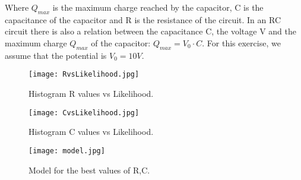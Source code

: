 \documentclass{article}
\begin{document}
Where $Q_{max}$ is the maximum charge reached by the capacitor, C is the capacitance of the capacitor and R is the resistance of the circuit. In an RC circuit there is also a relation between the capacitance C, the voltage V and the maximum charge $Q_{max}$ of the capacitor: $Q_{max} = V_0 \cdot C$. For this exercise, we assume that the potential is $V_0 = 10V$.

\begin{figure}[h!]
   \centering
    \texttt{[image: RvsLikelihood.jpg]}
    \caption{Histogram R values vs Likelihood.}
    \label{histogram2}
\end{figure}

\begin{figure}[h!]
   \centering
    \texttt{[image: CvsLikelihood.jpg]}
    \caption{Histogram C values vs Likelihood.}
    \label{histogram3}
\end{figure}

\begin{figure}[h!]
   \centering
    \texttt{[image: model.jpg]}
    \caption{Model for the best values of R,C.}
    \label{model}
\end{figure}
\end{document}
